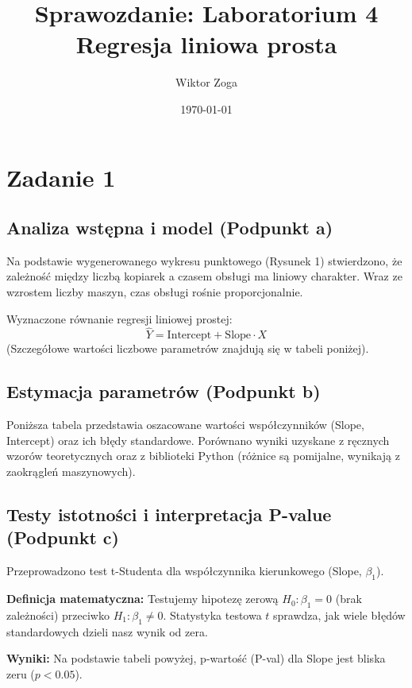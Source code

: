 \documentclass[12pt, a4paper]{article}
\title{\textbf{Sprawozdanie: Laboratorium 4} \\ \large Regresja liniowa prosta}
\author{Wiktor Zoga}
\date{\today}
\begin{document}
\maketitle

\section{Zadanie 1}

\subsection{Analiza wstępna i model (Podpunkt a)}
Na podstawie wygenerowanego wykresu punktowego (Rysunek 1) stwierdzono, że zależność między liczbą kopiarek a czasem obsługi ma liniowy charakter. Wraz ze wzrostem liczby maszyn, czas obsługi rośnie proporcjonalnie.

Wyznaczone równanie regresji liniowej prostej:
\begin{equation}
    \hat{Y} = \text{Intercept} + \text{Slope} \cdot X
\end{equation}
(Szczegółowe wartości liczbowe parametrów znajdują się w tabeli poniżej).

\subsection{Estymacja parametrów (Podpunkt b)}
Poniższa tabela przedstawia oszacowane wartości współczynników (Slope, Intercept) oraz ich błędy standardowe. Porównano wyniki uzyskane z ręcznych wzorów teoretycznych oraz z biblioteki Python (różnice są pomijalne, wynikają z zaokrągleń maszynowych).



\subsection{Testy istotności i interpretacja P-value (Podpunkt c)}
Przeprowadzono test t-Studenta dla współczynnika kierunkowego (Slope, $\beta_1$).

\textbf{Definicja matematyczna:}
Testujemy hipotezę zerową $H_0: \beta_1 = 0$ (brak zależności) przeciwko $H_1: \beta_1 \neq 0$. Statystyka testowa $t$ sprawdza, jak wiele błędów standardowych dzieli nasz wynik od zera.

\textbf{Wyniki:}
Na podstawie tabeli powyżej, p-wartość (P-val) dla Slope jest bliska zeru ($p < 0.05$).
\end{document}
